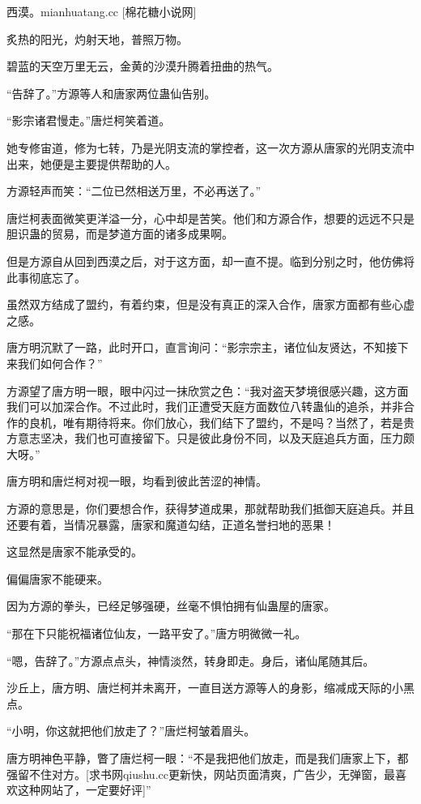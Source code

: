 
\begin{this_body}

西漠。mianhuatang.cc [棉花糖小说网]

炙热的阳光，灼射天地，普照万物。

碧蓝的天空万里无云，金黄的沙漠升腾着扭曲的热气。

“告辞了。”方源等人和唐家两位蛊仙告别。

“影宗诸君慢走。”唐烂柯笑着道。

她专修宙道，修为七转，乃是光阴支流的掌控者，这一次方源从唐家的光阴支流中出来，她便是主要提供帮助的人。

方源轻声而笑：“二位已然相送万里，不必再送了。”

唐烂柯表面微笑更洋溢一分，心中却是苦笑。他们和方源合作，想要的远远不只是胆识蛊的贸易，而是梦道方面的诸多成果啊。

但是方源自从回到西漠之后，对于这方面，却一直不提。临到分别之时，他仿佛将此事彻底忘了。

虽然双方结成了盟约，有着约束，但是没有真正的深入合作，唐家方面都有些心虚之感。

唐方明沉默了一路，此时开口，直言询问：“影宗宗主，诸位仙友贤达，不知接下来我们如何合作？”

方源望了唐方明一眼，眼中闪过一抹欣赏之色：“我对盗天梦境很感兴趣，这方面我们可以加深合作。不过此时，我们正遭受天庭方面数位八转蛊仙的追杀，并非合作的良机，唯有期待将来。你们放心，我们结下了盟约，不是吗？当然了，若是贵方意志坚决，我们也可直接留下。只是彼此身份不同，以及天庭追兵方面，压力颇大呀。”

唐方明和唐烂柯对视一眼，均看到彼此苦涩的神情。

方源的意思是，你们要想合作，获得梦道成果，那就帮助我们抵御天庭追兵。并且还要有着，当情况暴露，唐家和魔道勾结，正道名誉扫地的恶果！

这显然是唐家不能承受的。

偏偏唐家不能硬来。

因为方源的拳头，已经足够强硬，丝毫不惧怕拥有仙蛊屋的唐家。

“那在下只能祝福诸位仙友，一路平安了。”唐方明微微一礼。

“嗯，告辞了。”方源点点头，神情淡然，转身即走。身后，诸仙尾随其后。

沙丘上，唐方明、唐烂柯并未离开，一直目送方源等人的身影，缩减成天际的小黑点。

“小明，你这就把他们放走了？”唐烂柯皱着眉头。

唐方明神色平静，瞥了唐烂柯一眼：“不是我把他们放走，而是我们唐家上下，都强留不住对方。[求书网qiushu.cc更新快，网站页面清爽，广告少，无弹窗，最喜欢这种网站了，一定要好评]”


\end{this_body}
